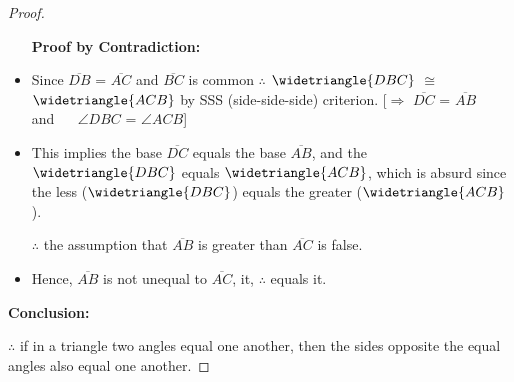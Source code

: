 \begin{proof}

\begin{itemize}
\item[]
    	\textbf{ Proof by Contradiction: }
    	\item Since $\overline{DB}$ = $\overline{AC}$ and $\overline{BC}$ is common $\therefore$ $\widetriangle{DBC}$ $\cong$ $\widetriangle{ACB}$ by SSS (side-side-side) criterion.  [$\Rightarrow$ $\overline{DC}$ = $\overline{AB}$ $\quad$ and $\quad$ $\angle{DBC}$ = $\angle{ACB}$]
    	\item This implies the base $\overline{DC}$ equals the base $\overline{AB}$, and the $\widetriangle{DBC}$ equals $\widetriangle{ACB}$, which is absurd since the less ($\widetriangle{DBC}$) equals the greater ($\widetriangle{ACB}$).
    	\item[ $\therefore$] the assumption that $\overline{AB}$ is greater than $\overline{AC}$ is false.
    	\item Hence, $\overline{AB}$ is not unequal to $\overline{AC}$, it, $\therefore$ equals it.
\end{itemize}

\textbf{Conclusion:}

$\therefore$ if in a triangle two angles equal one another, then the sides opposite the equal angles also equal one another.
\end{proof}
	
\clearpage
